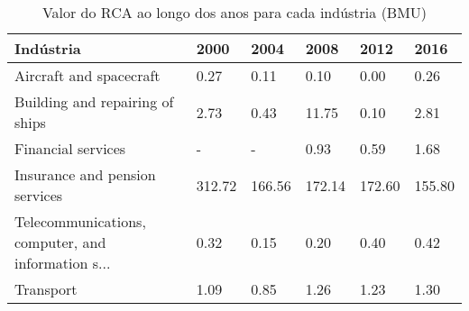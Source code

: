 \begin{table}
\centering
\caption{Valor do RCA ao longo dos anos para cada indústria (BMU)}
\begin{tabular}{p{6cm}p{1.5cm}p{1.5cm}p{1.5cm}p{1.5cm}p{1.5cm}}
\toprule
                                         Indústria &   2000 &   2004 &   2008 &   2012 &   2016 \\
\midrule
                           Aircraft and spacecraft &   0.27 &   0.11 &   0.10 &   0.00 &   0.26 \\
                   Building and repairing of ships &   2.73 &   0.43 &  11.75 &   0.10 &   2.81 \\
                                Financial services &      - &      - &   0.93 &   0.59 &   1.68 \\
                    Insurance and pension services & 312.72 & 166.56 & 172.14 & 172.60 & 155.80 \\
Telecommunications, computer, and information s... &   0.32 &   0.15 &   0.20 &   0.40 &   0.42 \\
                                         Transport &   1.09 &   0.85 &   1.26 &   1.23 &   1.30 \\
\bottomrule
\end{tabular}
\end{table}
